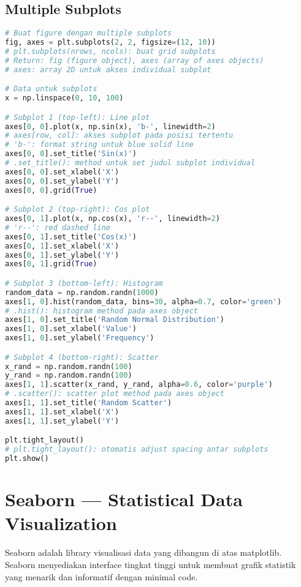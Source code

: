 \subsection*{Multiple Subplots}

\begin{lstlisting}[language=python, caption={Membuat Grid Subplots}, style=python]
# Buat figure dengan multiple subplots
fig, axes = plt.subplots(2, 2, figsize=(12, 10))
# plt.subplots(nrows, ncols): buat grid subplots
# Return: fig (figure object), axes (array of axes objects)
# axes: array 2D untuk akses individual subplot

# Data untuk subplots
x = np.linspace(0, 10, 100)

# Subplot 1 (top-left): Line plot
axes[0, 0].plot(x, np.sin(x), 'b-', linewidth=2)
# axes[row, col]: akses subplot pada posisi tertentu
# 'b-': format string untuk blue solid line
axes[0, 0].set_title('Sin(x)')
# .set_title(): method untuk set judul subplot individual
axes[0, 0].set_xlabel('X')
axes[0, 0].set_ylabel('Y')
axes[0, 0].grid(True)

# Subplot 2 (top-right): Cos plot
axes[0, 1].plot(x, np.cos(x), 'r--', linewidth=2)
# 'r--': red dashed line
axes[0, 1].set_title('Cos(x)')
axes[0, 1].set_xlabel('X')
axes[0, 1].set_ylabel('Y')
axes[0, 1].grid(True)

# Subplot 3 (bottom-left): Histogram
random_data = np.random.randn(1000)
axes[1, 0].hist(random_data, bins=30, alpha=0.7, color='green')
# .hist(): histogram method pada axes object
axes[1, 0].set_title('Random Normal Distribution')
axes[1, 0].set_xlabel('Value')
axes[1, 0].set_ylabel('Frequency')

# Subplot 4 (bottom-right): Scatter
x_rand = np.random.randn(100)
y_rand = np.random.randn(100)
axes[1, 1].scatter(x_rand, y_rand, alpha=0.6, color='purple')
# .scatter(): scatter plot method pada axes object
axes[1, 1].set_title('Random Scatter')
axes[1, 1].set_xlabel('X')
axes[1, 1].set_ylabel('Y')

plt.tight_layout()
# plt.tight_layout(): otomatis adjust spacing antar subplots
plt.show()
\end{lstlisting}

\section{Seaborn — Statistical Data Visualization}

Seaborn adalah library visualisasi data yang dibangun di atas matplotlib. Seaborn menyediakan interface tingkat tinggi untuk membuat grafik statistik yang menarik dan informatif dengan minimal code.

